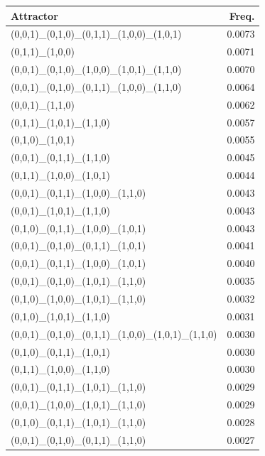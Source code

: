 \documentclass[11pt]{article}
\begin{document}
\begin{minipage}[t]{\linewidth}
\begin{tabular}{@{}lr@{}}
\toprule
Attractor & Freq.\\
\midrule
(0,0,1)\_(0,1,0)\_(0,1,1)\_(1,0,0)\_(1,0,1)      & 0.0073 \\
(0,1,1)\_(1,0,0)                                   & 0.0071 \\
(0,0,1)\_(0,1,0)\_(1,0,0)\_(1,0,1)\_(1,1,0)      & 0.0070 \\
(0,0,1)\_(0,1,0)\_(0,1,1)\_(1,0,0)\_(1,1,0)      & 0.0064 \\
(0,0,1)\_(1,1,0)                                   & 0.0062 \\
(0,1,1)\_(1,0,1)\_(1,1,0)                         & 0.0057 \\
(0,1,0)\_(1,0,1)                                   & 0.0055 \\
(0,0,1)\_(0,1,1)\_(1,1,0)                         & 0.0045 \\
(0,1,1)\_(1,0,0)\_(1,0,1)                         & 0.0044 \\
(0,0,1)\_(0,1,1)\_(1,0,0)\_(1,1,0)                & 0.0043 \\
(0,0,1)\_(1,0,1)\_(1,1,0)                         & 0.0043 \\
(0,1,0)\_(0,1,1)\_(1,0,0)\_(1,0,1)                & 0.0043 \\
(0,0,1)\_(0,1,0)\_(0,1,1)\_(1,0,1)                & 0.0041 \\
(0,0,1)\_(0,1,1)\_(1,0,0)\_(1,0,1)                & 0.0040 \\
(0,0,1)\_(0,1,0)\_(1,0,1)\_(1,1,0)                & 0.0035 \\
(0,1,0)\_(1,0,0)\_(1,0,1)\_(1,1,0)                & 0.0032 \\
(0,1,0)\_(1,0,1)\_(1,1,0)                         & 0.0031 \\
(0,0,1)\_(0,1,0)\_(0,1,1)\_(1,0,0)\_(1,0,1)\_(1,1,0) & 0.0030 \\
(0,1,0)\_(0,1,1)\_(1,0,1)                         & 0.0030 \\
(0,1,1)\_(1,0,0)\_(1,1,0)                         & 0.0030 \\
(0,0,1)\_(0,1,1)\_(1,0,1)\_(1,1,0)                & 0.0029 \\
(0,0,1)\_(1,0,0)\_(1,0,1)\_(1,1,0)                & 0.0029 \\
(0,1,0)\_(0,1,1)\_(1,0,1)\_(1,1,0)                & 0.0028 \\
(0,0,1)\_(0,1,0)\_(0,1,1)\_(1,1,0)                & 0.0027 \\

\end{tabular}
\end{minipage}
\end{document}
